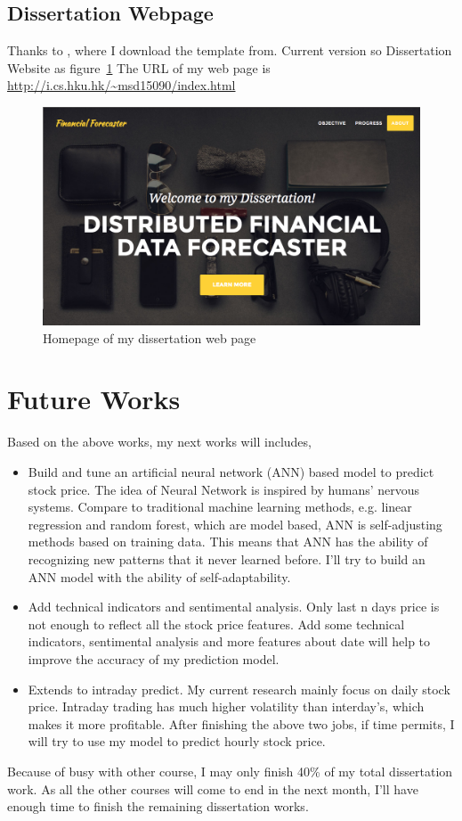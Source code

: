 \documentclass[12pt,a4paper]{scrartcl}
\begin{document}
	\subsection{Dissertation Webpage}
	Thanks to \cite{1_miller_2016}, where I download the template from. Current version so Dissertation Website as figure~\ref{fig:webpage} The URL of my web page is \url{http://i.cs.hku.hk/~msd15090/index.html}
	\begin{figure}[th]
		\centering
		\includegraphics[width=0.6\linewidth]{webpage}
		\caption{Homepage of my dissertation web page}
		\label{fig:webpage}
	\end{figure}
	\section{Future Works}
	Based on the above works, my next works will includes,
	\begin{itemize}
		\item Build and tune an artificial neural network (ANN) based model to predict stock price. The idea of Neural Network is inspired by humans' nervous systems. Compare to traditional machine learning methods, e.g. linear regression and random forest, which are model based, ANN is self-adjusting methods based on training data\cite{kimoto1990stock}. This means that ANN has the ability of recognizing new patterns that it never learned before. I'll try to build an ANN model with the ability of self-adaptability.
		\item Add technical indicators and sentimental analysis. Only last n days price is not enough to reflect all the stock price features. Add some technical indicators, sentimental analysis and more features about date will help to improve the accuracy of my prediction model.
		\item Extends to intraday predict. My current research mainly focus on daily stock price. Intraday trading has much higher volatility than interday's, which makes it more profitable. After finishing the above two jobs, if time permits, I will try to use my model to predict hourly stock price.
	\end{itemize}
	Because of busy with other course, I may only finish 40\% of my total dissertation work. As all the other courses will come to end in the next month, I'll have enough time to finish the remaining dissertation works. 
	
\end{document}
